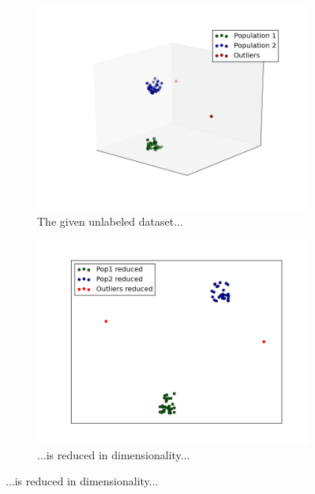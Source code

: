 \documentclass{vldb}
\begin{document}

\begin{figure}
\begin{subfigure}{.5 \textwidth}
	\centering
	\includegraphics[width=\linewidth]{"pics/outlier_basic"}
	\caption{The given unlabeled dataset...}
	\label{subfig:reduction-a}
\end{subfigure}
\begin{subfigure}{.5\textwidth}
  \centering
  \includegraphics[width=.76\linewidth]{"pics/reduced-rep"}
  \caption{...is reduced in dimensionality...}
  \label{subfig:reduction-b}
\end{subfigure}

\end{figure}
\end{document}
